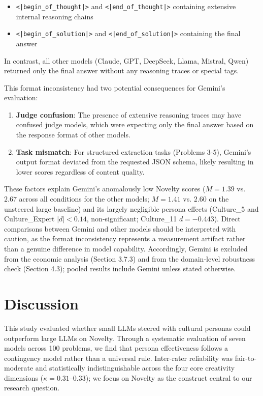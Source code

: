 \documentclass{article}
\begin{document}
\begin{itemize}
    \item \texttt{<|begin\_of\_thought|>} and \texttt{<|end\_of\_thought|>} containing extensive internal reasoning chains
    \item \texttt{<|begin\_of\_solution|>} and \texttt{<|end\_of\_solution|>} containing the final answer
\end{itemize}

In contrast, all other models (Claude, GPT, DeepSeek, Llama, Mistral, Qwen) returned only the final answer without any reasoning traces or special tags.

This format inconsistency had two potential consequences for Gemini's evaluation:

\begin{enumerate}
    \item \textbf{Judge confusion}: The presence of extensive reasoning traces may have confused judge models, which were expecting only the final answer based on the response format of other models.
    \item \textbf{Task mismatch}: For structured extraction tasks (Problems 3-5), Gemini's output format deviated from the requested JSON schema, likely resulting in lower scores regardless of content quality.
\end{enumerate}

These factors explain Gemini's anomalously low Novelty scores ($M = 1.39$ vs. $2.67$ across all conditions for the other models; $M = 1.41$ vs. $2.60$ on the unsteered large baseline) and its largely negligible persona effects (Culture\_5 and Culture\_Expert $|d| < 0.14$, non-significant; Culture\_11 $d = -0.443$). Direct comparisons between Gemini and other models should be interpreted with caution, as the format inconsistency represents a measurement artifact rather than a genuine difference in model capability. Accordingly, Gemini is excluded from the economic analysis (Section 3.7.3) and from the domain-level robustness check (Section 4.3); pooled results include Gemini unless stated otherwise.


\section{Discussion}

This study evaluated whether small LLMs steered with cultural personas could outperform large LLMs on Novelty. Through a systematic evaluation of seven models across 100 problems, we find that persona effectiveness follows a contingency model rather than a universal rule. Inter-rater reliability was fair-to-moderate and statistically indistinguishable across the four core creativity dimensions (\(\kappa = 0.31\)--\(0.33\)); we focus on Novelty as the construct central to our research question.
\end{document}
